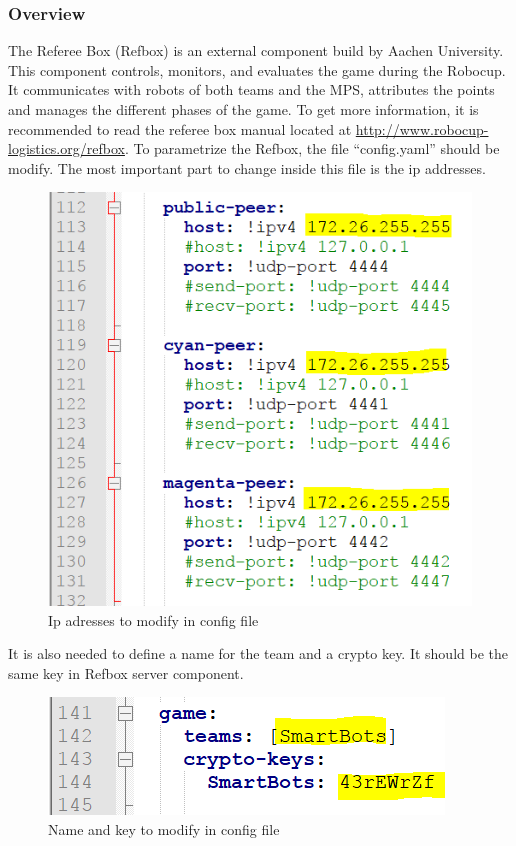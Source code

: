 
\subsubsection{Overview}

The Referee Box (Refbox) is an external component build by Aachen University. This component controls, monitors, and evaluates the game during the Robocup. It communicates with robots of both teams and the MPS, attributes the points and manages the different phases of the game. To get more information, it is recommended to read the referee box manual located at \url{http://www.robocup-logistics.org/refbox}. To parametrize the Refbox, the file “config.yaml” should be modify. The most important part to change inside this file is the ip addresses. \\

\begin{figure}[!h]
\centering
\includegraphics[]{pic/config_file_1.png}
\caption{Ip adresses to modify in config file}
\label{fig:conf1}
\end{figure}

It is also needed to define a name for the team and a crypto key. It should be the same key in Refbox server component.

\begin{figure}[!h]
\centering
\includegraphics[]{pic/config_file_2.png}
\caption{Name and key to modify in config file}
\label{fig:conf2}
\end{figure}

